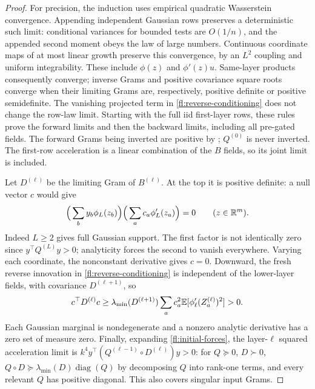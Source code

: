 \begin{proof}
For precision, the induction uses empirical quadratic Wasserstein convergence.
Appending independent Gaussian rows preserves a deterministic such limit:
conditional variances for bounded tests are $O(1/n)$, and the appended
second moment obeys the law of large numbers. Continuous coordinate maps
of at most linear growth preserve this convergence, by an $L^2$ coupling
and uniform integrability. These include $\phi(z)$ and $\phi'(z)u$.
Same-layer products consequently converge; inverse Grams and positive
covariance square roots converge when their limiting Grams are, respectively,
positive definite or positive semidefinite. The vanishing projected term
in \eqref{fl:reverse-conditioning} does not change the row-law limit.
Starting with the full iid first-layer rows, these rules prove the forward
limits and then the backward limits, including all pre-gated fields.
The forward Grams being inverted are positive by ;
$Q^{(0)}$ is never inverted. The first-row acceleration is a linear
combination of the $B$ fields, so its joint limit is included.

Let $D^{(\ell)}$ be the limiting Gram of $B^{(\ell)}$.
At the top it is positive definite: a null vector $c$ would give
\[
 \Big(\sum_b y_b\phi_L(z_b)\Big)
 \Big(\sum_a c_a\phi_L'(z_a)\Big)=0\qquad(z\in\mathbb R^m).
\]
Indeed $L\ge2$ gives full Gaussian support. The first factor is not
identically zero since $y^\top Q^{(L)}y>0$; analyticity forces the
second to vanish everywhere. Varying each coordinate, the nonconstant
derivative gives $c=0$. Downward, the fresh reverse innovation in
\eqref{fl:reverse-conditioning} is independent of the lower-layer fields,
with covariance $D^{(\ell+1)}$, so
\[
 c^\top D^{(\ell)}c\ge\lambda_{\min}(D^{(\ell+1)})
       \sum_a c_a^2\mathbb E[\phi_\ell'(Z_a^{(\ell)})^2]>0.
\]
Each Gaussian marginal is nondegenerate and a nonzero analytic derivative
has a zero set of measure zero. Finally, expanding \eqref{fl:initial-forces},
the layer-$\ell$ squared acceleration limit is
$k^4y^\top(Q^{(\ell-1)}\circ D^{(\ell)})y>0$:
for $Q\succeq0$, $D\succ0$,
$Q\circ D\succeq\lambda_{\min}(D)\operatorname{diag}(Q)$ by decomposing
$Q$ into rank-one terms, and every
relevant $Q$ has positive diagonal. This also covers singular input Grams.
\end{proof}


